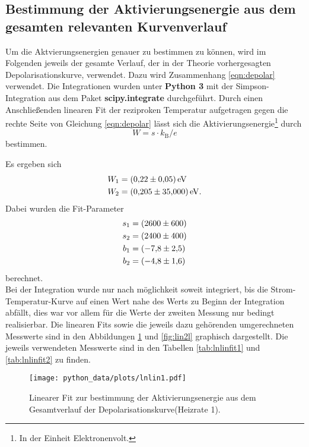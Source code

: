 \subsection{Bestimmung der Aktivierungsenergie aus dem gesamten relevanten Kurvenverlauf}
\label{subsec:method2}

Um die Aktvierungsenergien genauer zu bestimmen zu können, wird im Folgenden jeweils der gesamte Verlauf, der in der Theorie vorhergesagten Depolarisationskurve,
verwendet. Dazu wird Zusammenhang \eqref{eqn:depolar} verwendet. Die Integrationen wurden unter \textbf{Python 3} mit der Simpson-Integration aus dem Paket \textbf{scipy.integrate} durchgeführt.
Durch einen Anschließenden linearen Fit der reziproken Temperatur aufgetragen gegen die rechte Seite von Gleichung \eqref{eqn:depolar} lässt sich die
Aktivierungsenergie\footnote{In der Einheit Elektronenvolt.} durch
\\
\begin{equation}
  \label{eqn:W2}
  W = s \cdot k_\text{B} / e
\end{equation}
bestimmen.


Es ergeben sich
\\
\begin{align*}
  W_{1} &= \SI{0.22+-0.05}{\electronvolt} \\
  W_{2} &= \SI{0.205+-035}{\electronvolt}.
\end{align*}
Dabei wurden die Fit-Parameter
\\
\begin{align*}
  s_{1} &= \SI{2600+-600}{}  \\
  s_{2} &= \SI{2400+-400}{}  \\
  b_{1} &= \SI{-7.8+-2.5}{}  \\
  b_{2} &= \SI{-4.8+-1.6}{}
\end{align*}
berechnet.
\\
Bei der Integration wurde nur nach möglichkeit soweit integriert, bis die Strom-Temperatur-Kurve auf einen Wert nahe des Werts zu Beginn der Integration abfällt, dies war vor allem für
die Werte der zweiten Messung nur bedingt realisierbar.
Die linearen Fits sowie die jeweils dazu gehörenden umgerechneten Messwerte sind in den Abbildungen \ref{fig:lin1l} und \ref{fig:lin2l} graphisch dargestellt.
Die jeweils verwendeten Messwerte sind in den Tabellen \ref{tab:lnlinfit1} und \ref{tab:lnlinfit2} zu finden.
\\

\begin{figure}
  \centering
  \texttt{[image: python\_data/plots/lnlin1.pdf]}
  \caption{Linearer Fit zur bestimmung der Aktivierungsenergie aus dem Gesamtverlauf der Depolarisationskurve(Heizrate 1).}
  \label{fig:lin1l}
\end{figure}


